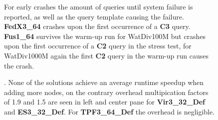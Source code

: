 \documentclass[twocolumn]{bmcart}%
\def\texttt{[image: ]}
\begin{document}
\begin{backmatter}
\begin{figure}[ht!]
	\centering
	\caption{ For early crashes the amount of queries until system failure is reported, as well as the query template causing the failure. \textbf{FedX3\_64} crashes upon the first occurrence of a \textbf{C3} query. \textbf{Fus1\_64} survives the warm-up run for WatDiv100M but crashes upon the first occurrence of a \textbf{C2} query in the stress test, for WatDiv1000M again the first \textbf{C2} query in the warm-up run causes the crash.}
	\label{fig:Fig03_BenchmarkSurvival_Other_Watdiv_Default}
\end{figure}   

\begin{figure}[ht!]
	\centering
	\caption{. None of the solutions achieve an average runtime speedup when adding more nodes, on the contrary overhead multipication factors of 1.9 and 1.5 are seen in left and center pane for \textbf{Vir3\_32\_Def} and \textbf{ES3\_32\_Def}. For \textbf{TPF3\_64\_Def} the overhead is negligible.}
	\label{fig:Fig04_WatdivHorizontalScaling}
\end{figure}



\end{backmatter}
\end{document}
